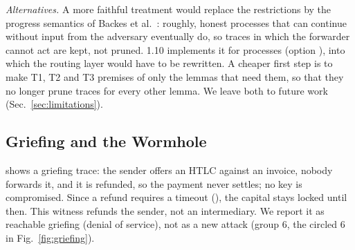 \emph{Alternatives.} A more faithful treatment would replace the restrictions by the progress
semantics of Backes et al.~\cite{backes2017}: roughly, honest processes that can continue
without input from the adversary eventually do, so traces in which the forwarder cannot act are
kept, not pruned. \tamarin{} 1.10 implements it for \sapic{} processes (option
), into which the routing layer would have to be rewritten. A cheaper
first step is to make T1, T2 and T3 premises of only the lemmas that need them, so that they no
longer prune traces for every other lemma. We leave both to future work
(Sec.~\ref{sec:limitations}).

\subsection{Griefing and the Wormhole}\label{sec:wormhole}

 shows a griefing trace: the sender offers an HTLC against an invoice,
nobody forwards it, and it is refunded, so the payment never settles; no key is compromised.
Since a refund requires a timeout (), the capital stays locked
until then. This witness refunds the sender, not an intermediary. We report it as reachable
griefing (denial of service), not as a new attack (group 6, the circled 6 in
Fig.~\ref{fig:griefing}).


